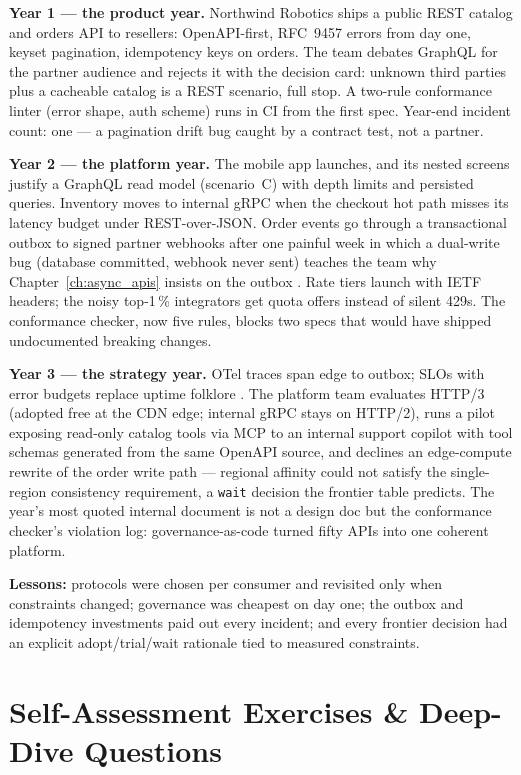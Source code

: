 \textbf{Year 1 --- the product year.} Northwind Robotics ships a public REST
catalog and orders API to resellers: OpenAPI-first, RFC~9457 errors from day
one, keyset pagination, idempotency keys on orders. The team debates GraphQL
for the partner audience and rejects it with the decision card: unknown third
parties plus a cacheable catalog is a REST scenario, full stop. A two-rule
conformance linter (error shape, auth scheme) runs in CI from the first
spec. Year-end incident count: one --- a pagination drift bug caught by a
contract test, not a partner.

\textbf{Year 2 --- the platform year.} The mobile app launches, and its
nested screens justify a GraphQL read model (scenario~C) with depth limits
and persisted queries. Inventory moves to internal gRPC when the checkout hot
path misses its latency budget under REST-over-JSON. Order events go through
a transactional outbox to signed partner webhooks after one painful week in
which a dual-write bug (database committed, webhook never sent) teaches the
team why Chapter~\ref{ch:async_apis} insists on the outbox
\cite{kleppmann2017ddia}. Rate tiers launch with IETF headers; the noisy
top-1\,\% integrators get quota offers instead of silent 429s. The
conformance checker, now five rules, blocks two specs that would have shipped
undocumented breaking changes.

\textbf{Year 3 --- the strategy year.} OTel traces span edge to outbox; SLOs
with error budgets replace uptime folklore \cite{beyer2016sre}. The platform
team evaluates HTTP/3 (adopted free at the CDN edge; internal gRPC stays on
HTTP/2), runs a pilot exposing read-only catalog tools via MCP to an internal
support copilot with tool schemas generated from the same OpenAPI source, and
declines an edge-compute rewrite of the order write path --- regional
affinity could not satisfy the single-region consistency requirement, a
\texttt{wait} decision the frontier table predicts. The year's most quoted
internal document is not a design doc but the conformance checker's violation
log: governance-as-code turned fifty APIs into one coherent platform.

\textbf{Lessons:} protocols were chosen per consumer and revisited only when
constraints changed; governance was cheapest on day one; the outbox and
idempotency investments paid out every incident; and every frontier decision
had an explicit adopt/trial/wait rationale tied to measured constraints.

\section{Self-Assessment Exercises \& Deep-Dive Questions}

